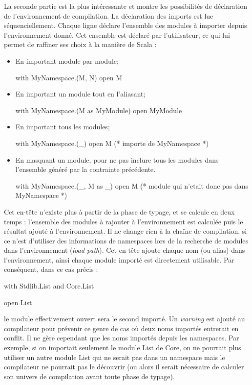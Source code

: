 \documentclass[11pt,a4paper]{report}
\begin{document}
La seconde partie est la plus intéressante et montre les possibilités de
déclaration de l'environnement de compilation. La déclaration des imports est
lue séquenciellement. Chaque ligne déclare l'ensemble des modules à importer
depuis l'environnement donné. Cet ensemble est déclaré par l'utilisateur, ce qui
lui permet de raffiner ses choix à la manière de Scala :
\begin{itemize}
\item En important module par module;
\begin{OCaml}
with MyNamespace.(M, N)
open M
\end{OCaml}
\item En important un module tout en l'aliasant;
\begin{OCaml}
with MyNamespace.(M as MyModule)
open MyModule 
\end{OCaml}
\item En important tous les modules;
\begin{OCaml}
with MyNamespace.(_)
open M (* importe de MyNamespace *)
\end{OCaml}
\item En masquant un module, pour ne pas inclure tous les modules dans
  l'ensemble généré par la contrainte précédente.
\begin{OCaml}
with MyNamespace.(_, M as _)
open M (* module qui n'etait donc pas dans MyNamespace *)
\end{OCaml}
\end{itemize}

Cet en-tête n'existe plus à partir de la phase de typage, et se calcule en deux
temps : l'ensemble des modules à rajouter à l'environnement est calculée puis le
résultat ajouté à l'environnement. Il ne change rien à la chaîne de compilation,
si ce n'est d'utiliser des informations de namespaces lors de la recherche de
modules dans l'environnement (\emph{load path}). Cet en-tête ajoute chaque nom
(ou alias) dans l'environnement, ainsi chaque module importé est directement
utilisable. Par conséquent, dans ce cas précis :
\begin{OCaml}
with Stdlib.List
and Core.List

open List
\end{OCaml}
le module effectivement ouvert sera le second importé. Un \emph{warning} est
ajouté au compilateur pour prévenir ce genre de cas où deux noms importés
entrerait en conflit. Il ne gère cependant que les noms importés depuis les
namespaces. Par exemple, si on importait seulement le module List de Core, on ne
pourrait plus utiliser un autre module List qui ne serait pas dans un namespace
mais le compilateur ne pourrait pas le découvrir (ou alors il serait nécessaire
de calculer son univers de compilation avant toute phase de typage).
\end{document}
